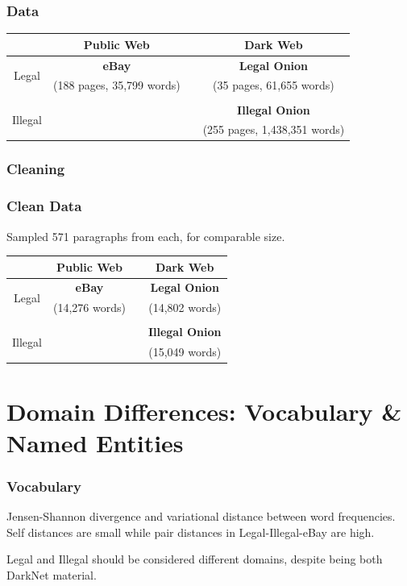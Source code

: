 \documentclass[t,xcolor={svgnames,table}]{beamer}
\begin{document}
\begin{frame}
	\frametitle{Data}
	
	\begin{center}
	\def\arraystretch{2}
	\begin{tabular}{c|ccc}
	& Public Web && Dark Web \\ 
	\hline
	\multirow{2}{*}{Legal} & \textbf{\color{yellow} eBay} && \textbf{\color{green} Legal Onion} \\
	& (188 pages, 35,799 words) && (35 pages, 61,655 words) \\\\
	\multirow{2}{*}{Illegal} &&& \textbf{\color{red} Illegal Onion} \\
	&&& (255 pages, 1,438,351 words)
	\end{tabular}
	\end{center}
\end{frame}

\begin{frame}
	\frametitle{Cleaning}
\end{frame}

\begin{frame}
	\frametitle{Clean Data}

	Sampled 571 paragraphs from each, for comparable size.
	
	\begin{center}
	\def\arraystretch{2}
	\begin{tabular}{c|ccc}
	& Public Web && Dark Web \\ 
	\hline
	\multirow{2}{*}{Legal} & \textbf{\color{yellow} eBay} && \textbf{\color{green} Legal Onion} \\
	& (14,276 words) && (14,802 words) \\\\
	\multirow{2}{*}{Illegal} &&& \textbf{\color{red} Illegal Onion} \\
	&&& (15,049 words)
	\end{tabular}
	\end{center}
\end{frame}

\section{Domain Differences: Vocabulary \& Named Entities}

\begin{frame}
	\frametitle{Vocabulary}
	Jensen-Shannon divergence and variational distance between word frequencies.
	Self distances are small while pair distances in Legal-Illegal-eBay are high.
	
	Legal and Illegal should be considered different domains, despite being both DarkNet material.

\end{frame}
\end{document}
